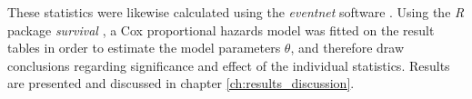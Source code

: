 \noindent These statistics were likewise calculated using the \emph{eventnet} software \cite{eventnet_rem,eventnet_rhem}. Using the \emph{R} package \emph{survival} \cite{survival-package}, a Cox proportional hazards model was fitted on the result tables in order to estimate the model parameters $\theta$, and therefore draw conclusions regarding significance and effect of the individual statistics. Results are presented and discussed in chapter \ref{ch:results_discussion}.

